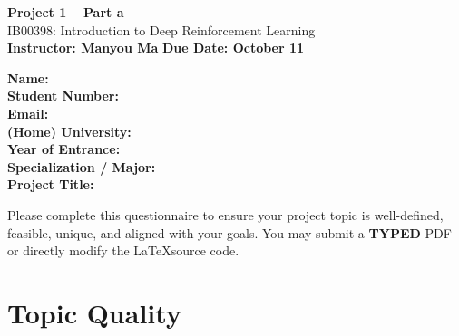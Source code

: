 \documentclass[12pt,a4paper]{article}
\begin{document}
\begin{center}
    {\LARGE \textbf{Project 1 – Part a}} \\[6pt]
    {\large IB00398: Introduction to Deep Reinforcement Learning} \\[3pt]
    \textbf{Instructor: Manyou Ma} \quad \textbf{Due Date: October 11}\\ [3pt]
\end{center}

\vspace{1em}

\noindent

\begin{tcolorbox}[colback=white,colframe=black,boxrule=0.6pt,arc=2pt]
\textbf{Name:} \hspace{8cm} \\[6pt]
\textbf{Student Number:} \hspace{6cm} \\[6pt]
\textbf{Email:} \hspace{8.2cm} \\[6pt]
\textbf{(Home) University:} \hspace{6.5cm} \\[6pt]
\textbf{Year of Entrance:} \hspace{6.5cm} \\[6pt]
\textbf{Specialization / Major:} \hspace{5.6cm} \\[6pt]
\textbf{Project Title:} \hspace{7.2cm}
\end{tcolorbox}

\vspace{1em}
\noindent
Please complete this questionnaire to ensure your project topic is well-defined, feasible, unique, and aligned with your goals. You may submit a \textbf{TYPED} PDF or directly modify the \LaTeX source code.  





\section*{Topic Quality}
\end{document}
